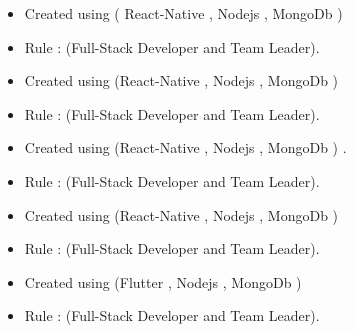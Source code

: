 
\clearpage
   \begin{itemize}
\item Created using ( React-Native , Nodejs , MongoDb ) 
\item Rule : (Full-Stack Developer and Team Leader). 
\end{itemize}
 \divider

   \begin{itemize}
\item Created using (React-Native , Nodejs , MongoDb ) 
\item Rule : (Full-Stack Developer and Team Leader). 
\end{itemize}

 \divider
 
   \begin{itemize}
\item Created using (React-Native , Nodejs , MongoDb ) .
\item Rule : (Full-Stack Developer and Team Leader). 
\end{itemize}
 \divider
 
  \begin{itemize}
\item Created using (React-Native , Nodejs , MongoDb ) 
\item Rule : (Full-Stack Developer and Team Leader). 
\end{itemize}

 \divider
{} 
   \begin{itemize}
\item Created using (Flutter , Nodejs , MongoDb ) 
\item Rule : (Full-Stack Developer and Team Leader). 
\end{itemize}
 \divider
 